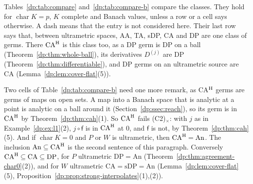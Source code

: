 Tables~\ref{dp:tab:compare} and~\ref{dp:tab:compare-b} compare the classes. They hold for $\operatorname{char}K=p$, $K$ complete and Banach values, unless a row or a cell says otherwise. A dash means that the entry is not considered here. Their last row says that, between ultrametric spaces, AA, TA, sDP, CA and DP are one class of germs. There $\mathrm{CA}^{\rm H}$ is this class too, as a DP germ is DP on a ball (Theorem~\ref{dp:thm:whole-ball}), its derivatives $D^{(j)}$ are DP (Theorem~\ref{dp:thm:differentiable}), and DP germs on an ultrametric source are CA (Lemma~\ref{dp:lem:cover-flat}(5)).

Two cells of Table~\ref{dp:tab:compare-b} need one more remark, as CA$^{\rm H}$ germs are germs of maps on open sets. A map into a Banach space that is analytic at a point is analytic on a ball around it (Section~\ref{dp:ssec:reach}), so its germ is in $\mathrm{CA}^{\rm H}$ by Theorem~\ref{dp:thm:cah}(1). So $\mathrm{CA}^{\rm H}$ fails (C2)$_\times$: with $j$ as in Example~\ref{dp:ex:l1}(2), $j\circ\mathsf f$ is in $\mathrm{CA}^{\rm H}$ at $0$, and $\mathsf f$ is not, by Theorem~\ref{dp:thm:cah}(5). And if $\operatorname{char}K=0$ and $P$ or $W$ is ultrametric, then $\mathrm{CA}^{\rm H}=\mathrm{An}$. The inclusion $\mathrm{An}\subseteq\mathrm{CA}^{\rm H}$ is the second sentence of this paragraph. Conversely $\mathrm{CA}^{\rm H}\subseteq\mathrm{CA}\subseteq\mathrm{DP}$, for $P$ ultrametric $\mathrm{DP}=\mathrm{An}$ (Theorem~\ref{dp:thm:agreement-char0}(2)), and for $W$ ultrametric $\mathrm{CA}=\mathrm{sDP}=\mathrm{An}$ (Lemma~\ref{dp:lem:cover-flat}(5), Proposition~\ref{dp:prop:strong-interpolates}(1),(2)).

